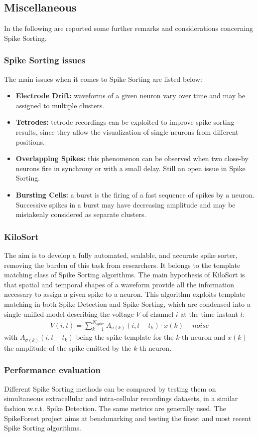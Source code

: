 \subsection{Miscellaneous}
In the following are reported some further remarks and considerations concerning
Spike Sorting.
\subsubsection{Spike Sorting issues}
The main issues when it comes to Spike Sorting are listed below:
\begin{itemize}
    \item \textbf{Electrode Drift:} waveforms of a given neuron vary over
          time and may be assigned to multiple clusters.
    \item \textbf{Tetrodes:} tetrode recordings can be exploited to improve
          spike sorting results, since they allow the visualization of single
          neurons from different positions.
    \item \textbf{Overlapping Spikes:} this phenomenon can be observed when
          two close-by neurons fire in synchrony or with a small delay. Still
          an open issue in Spike Sorting.
    \item \textbf{Bursting Cells:} a burst is the firing of a fast sequence
          of spikes by a neuron. Successive spikes in a burst may have decreasing
          amplitude and may be mistakenly considered as separate clusters.
\end{itemize}
\subsubsection{KiloSort}
The aim is to develop a fully automated, scalable, and accurate spike sorter,
removing the burden of this task from researchers. It belongs to the template
matching class of Spike Sorting algorithms.
The main hypothesis of KiloSort is that spatial and temporal shapes of a waveform
provide all the information necessary to assign a given spike to a neuron.
This algorithm exploits template matching in both Spike Detection and Spike
Sorting, which are condensed into a single unified model describing the voltage
\(V\) of channel \(i\) at the time instant \(t\):
\begin{align*}
    V(i,t)=\sum_{k=1}^{N_{spike}}A_{\sigma(k)}(i,t-t_k)\cdot x(k) + noise
\end{align*}
with \(A_{\sigma(k)}(i,t-t_k)\) being the spike template for the \(k\)-th neuron
and \(x(k)\) the amplitude of the spike emitted by the \(k\)-th neuron.
\subsubsection{Performance evaluation}
Different Spike Sorting methods can be compared by testing them on simultaneous
extracellular and intra-cellular recordings datasets, in a similar fashion w.r.t.
Spike Detection. The same metrics are generally used. The SpikeForest project
aims at benchmarking and testing the finest and most recent Spike Sorting
algorithms.